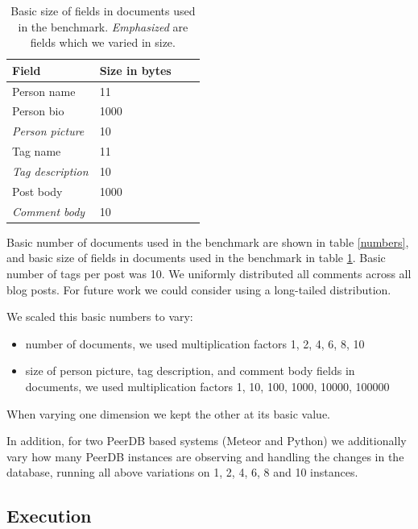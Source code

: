 \begin{table}
  \small
  \begin{center}
  \begin{tabular}{|l|l|l|l|}
    \hline
    Field & Size in bytes\\
    \hline
    Person name & 11 \\
    Person bio & 1000 \\ 
    \emph{Person picture} & 10 \\
    Tag name & 11 \\ 
    \emph{Tag description} & 10 \\
    Post body & 1000 \\
    \emph{Comment body} & 10 \\
    \hline

  \end{tabular}
  \end{center}
  \caption{Basic size of fields in documents used in the benchmark.
  \emph{Emphasized} are fields which we varied in size.}
  \label{sizes}
\end{table}

Basic number of documents used in the benchmark are shown in table \ref{numbers}, and basic size of fields in documents used in the benchmark in table \ref{sizes}.
Basic number of tags per post was 10.
We uniformly distributed all comments across all blog posts. For future work we could consider using a long-tailed distribution.

We scaled this basic numbers to vary:
\begin{itemize}
\item number of documents, we used multiplication factors 1, 2, 4, 6, 8, 10
\item size of person picture, tag description, and comment body fields in documents, we used multiplication factors 1, 10, 100, 1000, 10000, 100000
\end{itemize}

When varying one dimension we kept the other at its basic value.

In addition, for two PeerDB based systems (Meteor and Python) we additionally vary how many PeerDB instances are observing and handling the changes in the database, running all above variations on 1, 2, 4, 6, 8 and 10 instances.

\subsection{Execution}


